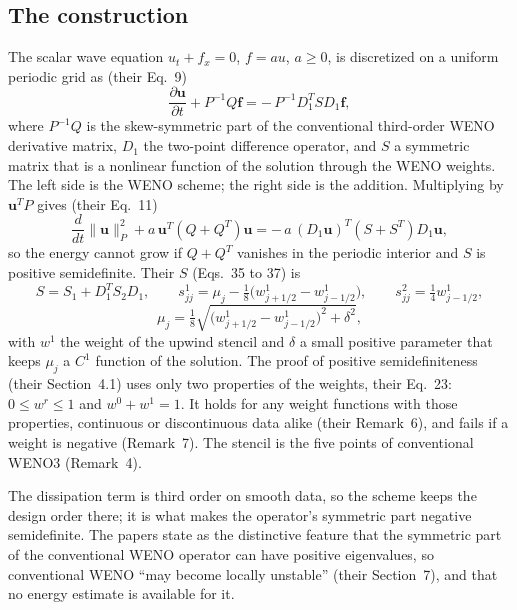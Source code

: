 \documentclass[english,a4paper]{my_memo}
\begin{document}
\subsection{The construction}

The scalar wave equation $u_t + f_x = 0$, $f = au$, $a \ge 0$, is
discretized on a uniform periodic grid as (their Eq.~9)
\begin{equation}
  \frac{\partial \mathbf{u}}{\partial t} + P^{-1} Q \mathbf{f}
  = -\,P^{-1} D_1^{T} S D_1 \mathbf{f},
  \label{eq:esweno}
\end{equation}
where $P^{-1}Q$ is the skew-symmetric part of the conventional third-order
WENO derivative matrix, $D_1$ the two-point difference operator, and $S$ a
symmetric matrix that is a nonlinear function of the solution through the
WENO weights. The left side is the WENO scheme; the right side is the
addition. Multiplying by $\mathbf{u}^{T}P$ gives (their Eq.~11)
\begin{equation}
  \frac{d}{dt}\|\mathbf{u}\|_P^2 + a\,\mathbf{u}^{T}(Q+Q^{T})\mathbf{u}
  = -\,a\,(D_1\mathbf{u})^{T}(S+S^{T})D_1\mathbf{u},
\end{equation}
so the energy cannot grow if $Q+Q^{T}$ vanishes in the periodic interior and
$S$ is positive semidefinite. Their $S$ (Eqs.~35 to 37) is
\begin{equation}
  S = S_1 + D_1^{T} S_2 D_1,\qquad
  s^{1}_{jj} = \mu_j - \tfrac{1}{8}\big(w^{1}_{j+1/2} - w^{1}_{j-1/2}\big),\qquad
  s^{2}_{jj} = \tfrac{1}{4} w^{1}_{j-1/2},
\end{equation}
\begin{equation}
  \mu_j = \tfrac{1}{8}\sqrt{\big(w^{1}_{j+1/2} - w^{1}_{j-1/2}\big)^2 + \delta^2},
\end{equation}
with $w^{1}$ the weight of the upwind stencil and $\delta$ a small positive
parameter that keeps $\mu_j$ a $C^1$ function of the solution. The proof of
positive semidefiniteness (their Section~4.1) uses only two properties of
the weights, their Eq.~23: $0 \le w^{r} \le 1$ and $w^{0} + w^{1} = 1$. It
holds for any weight functions with those properties, continuous or
discontinuous data alike (their Remark~6), and fails if a weight is negative
(Remark~7). The stencil is the five points of conventional WENO3 (Remark~4).

The dissipation term is third order on smooth data, so the scheme keeps the
design order there; it is what makes the operator's symmetric part
negative semidefinite. The papers state as the distinctive feature that the
symmetric part of the conventional WENO operator can have positive
eigenvalues, so conventional WENO ``may become locally unstable''
(their Section~7), and that no energy estimate is available for it.
\end{document}

